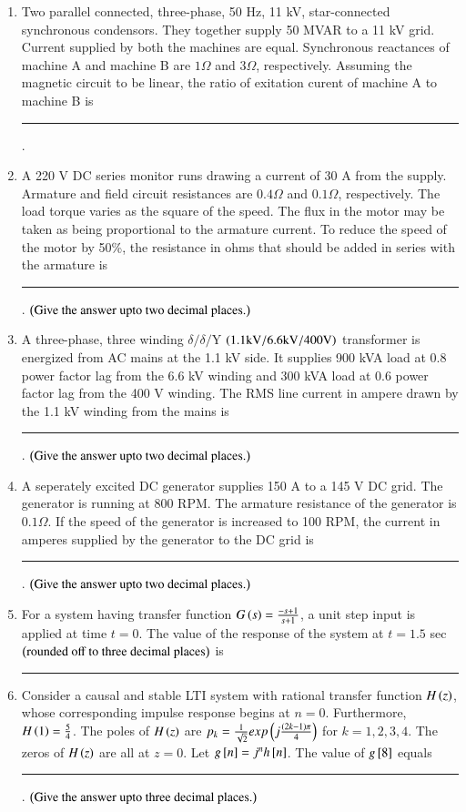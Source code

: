 \documentclass[journal]{IEEEtran}
\numberwithin{equation}{enumi}
\numberwithin{figure}{enumi}
\begin{document}
\begin{enumerate}
\item Two parallel connected, three-phase, 50 Hz, 11 kV, star-connected synchronous condensors. They together supply 50 MVAR to a 11 kV grid. Current supplied by both the machines are equal. Synchronous reactances of machine A and machine B are $1 \Omega$ and $3 \Omega$, respectively. Assuming the magnetic circuit to be linear, the ratio of exitation curent of machine A to machine B is \rule{1cm}{0.4pt}.
\item A 220 V DC series monitor runs drawing a current of 30 A from the supply. Armature and field circuit resistances are $0.4 \Omega$ and $0.1 \Omega$, respectively. The load torque varies as the square of the speed. The flux in the motor may be taken as being proportional to the armature current. To reduce the speed of the motor by 50\%, the resistance in ohms that should be added in series with the armature is \rule{1cm}{0.4pt}. $\left(\text{Give the answer upto two decimal places.}\right)$
\item A three-phase, three winding $\delta/\delta/\text{Y}$ $\left(1.1 \text{kV}/6.6 \text{kV}/400 \text{V}\right)$ transformer is energized from AC mains at the 1.1 kV side. It supplies 900 kVA load at 0.8 power factor lag from the 6.6 kV winding and 300 kVA load at 0.6 power factor lag from the 400 V winding. The RMS line current in ampere drawn by the 1.1 kV winding from the mains is \rule{1cm}{0.4pt}. $\left(\text{Give the answer upto two decimal places.}\right)$
\item A seperately excited DC generator supplies 150 A to a 145 V DC grid. The generator is running at 800 RPM. The armature resistance of the generator is $0.1 \Omega$. If the speed of the generator is increased to 100 RPM, the current in amperes supplied by the generator to the DC grid is \rule{1cm}{0.4pt}. $\left(\text{Give the answer upto two decimal places.}\right)$
\item For a system having transfer function $G\left(s\right) = \frac{-s + 1}{s + 1}$, a unit step input is applied at time $t = 0$. The value of the response of the system at $t = 1.5$ sec $\left(\text{rounded off to three decimal places}\right)$ is \rule{1cm}{0.4pt}
\item Consider a causal and stable LTI system with rational transfer function $H\left(z\right)$, whose corresponding impulse response begins at $n = 0$. Furthermore, $H\left(1\right) = \frac{5}{4}$. The poles of $H\left(z\right)$ are $p_k = \frac{1}{\sqrt{2}} exp\left(j\frac{\left(2k - 1\right)\pi}{4}\right)$ for $k = 1, 2, 3, 4$. The zeros of $H\left(z\right)$ are all at $z = 0$. Let $g{}\left[n\right] = j^nh{}\left[n\right]$. The value of $g{}\left[8\right]$ equals \rule{1cm}{0.4pt}. $\left(\text{Give the answer upto three decimal places.}\right)$

\end{enumerate}
\end{document}
